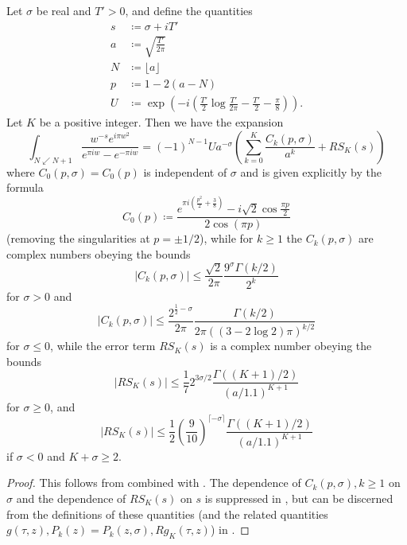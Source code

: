 \begin{proposition}\label{arias-prop}  Let $\sigma$ be real and $T'>0$, and define the quantities
\begin{align}
s &\coloneqq \sigma + iT' \label{s-def}\\
a &\coloneqq \sqrt{\frac{T'}{2\pi}} \label{a-def}\\
N &\coloneqq \lfloor a \rfloor \label{N-def}\\
p &\coloneqq 1 - 2(a-N) \label{p-def}\\
U &\coloneqq \exp\left( -i\left(\frac{T'}{2} \log \frac{T'}{2\pi} - \frac{T'}{2} - \frac{\pi}{8}\right) \right)\label{U-def}.
\end{align}
Let $K$ be a positive integer.  Then we have the expansion
$$ \int_{N \swarrow N+1} \frac{w^{-s} e^{i\pi w^2}}{e^{\pi i w} - e^{-\pi i w}} = (-1)^{N-1} U a^{-\sigma} \left(\sum_{k=0}^K \frac{C_k(p,\sigma)}{a^k} + RS_K(s)\right) $$
where $C_0(p,\sigma) = C_0(p)$ is independent of $\sigma$ and is given explicitly by the formula
\begin{equation}\label{C0-def}
C_0(p) \coloneqq \frac{e^{\pi i (\frac{p^2}{2} +\frac{3}{8})} - i \sqrt{2} \cos \frac{\pi p}{2}}{2 \cos(\pi p)}
\end{equation}
(removing the singularities at $p = \pm 1/2$), while for $k \geq 1$ the $C_k(p,\sigma)$ are complex numbers obeying the bounds
\begin{equation}\label{ck-bound-1}
|C_k(p,\sigma)| \leq \frac{\sqrt{2}}{2\pi} \frac{9^\sigma \Gamma(k/2)}{2^k}
\end{equation}
for $\sigma>0$ and
\begin{equation}\label{ck-bound-2}
|C_k(p,\sigma)| \leq \frac{2^{\frac{1}{2}-\sigma}}{2\pi} \frac{\Gamma(k/2)}{2\pi ((3-2\log 2)\pi)^{k/2}}
\end{equation}
for $\sigma \leq 0$, while the error term $RS_K(s)$ is a complex number obeying the bounds
\begin{equation}\label{rsk-bound-1}
|RS_K(s)| \leq \frac{1}{7} 2^{3\sigma/2} \frac{\Gamma((K+1)/2)}{(a/1.1)^{K+1}}
\end{equation}
for $\sigma \geq 0$, and
\begin{equation}\label{rsk-bound-2}
|RS_K(s)| \leq \frac{1}{2} \left(\frac{9}{10}\right)^{\lceil -\sigma \rceil} \frac{\Gamma((K+1)/2)}{(a/1.1)^{K+1}}
\end{equation}
if $\sigma < 0$ and $K + \sigma \geq 2$.
\end{proposition}

\begin{proof} This follows from \cite[Theorems 3.1, 4.1, 4.2]{arias} combined with \cite[(3.2), (5.2)]{arias}.  The dependence of $C_k(p,\sigma), k \geq 1$ on $\sigma$ and the dependence of $RS_K(s)$ on $s$ is suppressed in \cite{arias}, but can be discerned from the definitions of these quantities (and the related quantities $g(\tau,z), P_k(z) = P_k(z,\sigma), Rg_K(\tau,z)$) in \cite[(3.9), (3.10), (3.7), (3.6)]{arias}.
\end{proof}

